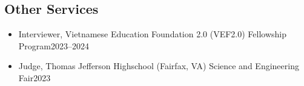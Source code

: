 \documentclass[11pt]{article}
\newcommand{\beforegmu}{\begin{center}\rule{2in}{0.8pt}~\textbf{Before GMU}~\rule{2in}{0.8pt}\end{center}}
\begin{document}
\myunitservices{}




\subsection{Other Services}
\begin{itemize}
    \item  Interviewer, Vietnamese Education Foundation 2.0 (VEF2.0) Fellowship Program\hfill 2023--2024
    \item Judge, Thomas Jefferson Highschool (Fairfax, VA) Science and Engineering Fair\hfill 2023
\end{itemize}
\end{document}
